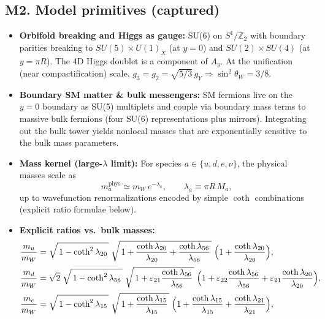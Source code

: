\documentclass[11pt]{article}
\begin{document}
      \subsection*{M2. Model primitives (captured)}
          \begin{itemize}
          \item \textbf{Orbifold breaking and Higgs as gauge:} SU(6) on $S^1/\mathbb Z_2$ with boundary parities breaking to $SU(5)\!\times\!U(1)_X$ (at $y{=}0$) and $SU(2)\!\times\!SU(4)$ (at $y{=}\pi R$). The 4D Higgs doublet is a component of $A_y$. At the unification (near compactification) scale, $g_3{=}g_2{=}\sqrt{5/3}\,g_Y \Rightarrow \sin^2\theta_W = 3/8$.
          \item \textbf{Boundary SM matter \& bulk messengers:} SM fermions live on the $y{=}0$ boundary as SU(5) multiplets and couple via boundary mass terms to massive bulk fermions (four SU(6) representations plus mirrors). Integrating out the bulk tower yields nonlocal masses that are exponentially sensitive to the bulk mass parameters.
          \item \textbf{Mass kernel (large-$\lambda$ limit):} For species $a\in\{u,d,e,\nu\}$, the physical masses scale as
          \[
              m^{\text{phys}}_a \simeq m_W\, e^{-\lambda_a},
              \qquad
              \lambda_a \equiv \pi R\,M_a,
          \]
          up to wavefunction renormalizations encoded by simple $\coth$ combinations (explicit ratio formulae below).
          \item \textbf{Explicit ratios vs.\ bulk masses:}
          \begin{align}
          \frac{m_u}{m_W}
          &= \sqrt{\,1-\coth^2\lambda_{20}\,}\;
          \sqrt{\,1+\frac{\coth\lambda_{20}}{\lambda_{20}}+\frac{\coth\lambda_{56}}{\lambda_{56}}\,}\;
          \Bigl(1+\frac{\coth\lambda_{20}}{\lambda_{20}}\Bigr),
          \\[2pt]
          \frac{m_d}{m_W}
          &= \sqrt{2}\;\sqrt{\,1-\coth^2\lambda_{56}\,}\;
          \sqrt{\,1+\varepsilon_{21}\frac{\coth\lambda_{56}}{\lambda_{56}}\,}\;
          \Bigl(1+\varepsilon_{22}\frac{\coth\lambda_{56}}{\lambda_{56}}
          +\varepsilon_{21}\frac{\coth\lambda_{20}}{\lambda_{20}}\Bigr),
          \\[2pt]
          \frac{m_e}{m_W}
          &= \sqrt{\,1-\coth^2\lambda_{15}\,}\;
          \sqrt{\,1+\frac{\coth\lambda_{15}}{\lambda_{15}}\,}\;
          \Bigl(1+\frac{\coth\lambda_{15}}{\lambda_{15}}+\frac{\coth\lambda_{21}}{\lambda_{21}}\Bigr),
          \\[2pt]

\end{align}
\end{itemize}
\end{document}
